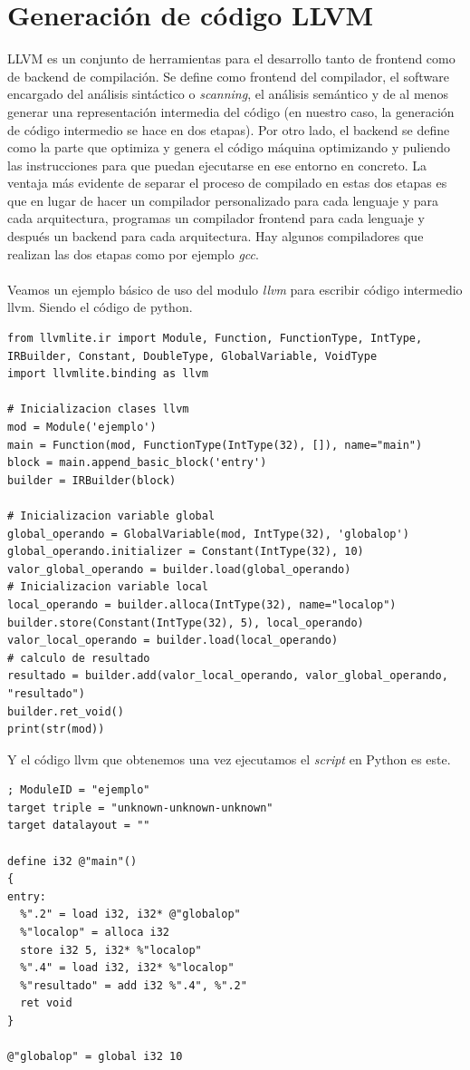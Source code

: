 \section{Generación de código LLVM}
\noindent LLVM es un conjunto de herramientas para el desarrollo tanto de frontend como de backend de compilación. Se define como frontend del compilador, el software encargado del análisis sintáctico o \textit{scanning}, el análisis semántico y de al menos generar una representación intermedia del código (en nuestro caso, la generación de código intermedio se hace en dos etapas). Por otro lado, el backend se define como la parte que optimiza y genera el código máquina optimizando y puliendo las instrucciones para que puedan ejecutarse en ese entorno en concreto. La ventaja más evidente de separar el proceso de compilado en estas dos etapas es que en lugar de hacer un compilador personalizado para cada lenguaje y para cada arquitectura, programas un compilador frontend para cada lenguaje y después un backend para cada arquitectura. Hay algunos compiladores que realizan las dos etapas como por ejemplo \textit{gcc}.\\\\
Veamos un ejemplo básico de uso del modulo \textit{llvm} para escribir código intermedio llvm. Siendo el código de python.
\begin{lstlisting}[style=pythonStyle]
from llvmlite.ir import Module, Function, FunctionType, IntType, IRBuilder, Constant, DoubleType, GlobalVariable, VoidType
import llvmlite.binding as llvm

# Inicializacion clases llvm
mod = Module('ejemplo')
main = Function(mod, FunctionType(IntType(32), []), name="main")
block = main.append_basic_block('entry')
builder = IRBuilder(block)

# Inicializacion variable global
global_operando = GlobalVariable(mod, IntType(32), 'globalop')
global_operando.initializer = Constant(IntType(32), 10)
valor_global_operando = builder.load(global_operando)
# Inicializacion variable local
local_operando = builder.alloca(IntType(32), name="localop")
builder.store(Constant(IntType(32), 5), local_operando)
valor_local_operando = builder.load(local_operando)
# calculo de resultado
resultado = builder.add(valor_local_operando, valor_global_operando, "resultado")
builder.ret_void()
print(str(mod))
\end{lstlisting}
Y el código llvm que obtenemos una vez ejecutamos el \textit{script} en Python es este.
\begin{lstlisting}[style=pythonStyle]
; ModuleID = "ejemplo"
target triple = "unknown-unknown-unknown"
target datalayout = ""

define i32 @"main"()
{
entry:
  %".2" = load i32, i32* @"globalop"
  %"localop" = alloca i32
  store i32 5, i32* %"localop"
  %".4" = load i32, i32* %"localop"
  %"resultado" = add i32 %".4", %".2"
  ret void
}

@"globalop" = global i32 10
\end{lstlisting}
